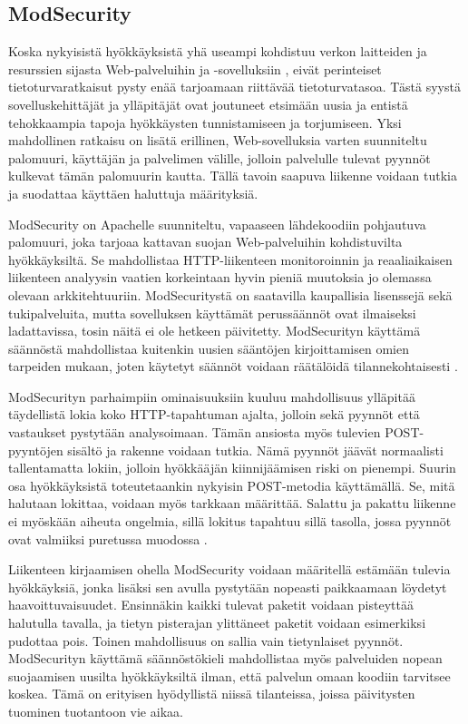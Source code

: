 \subsection{ModSecurity}

Koska nykyisistä hyökkäyksistä yhä useampi kohdistuu verkon laitteiden ja resurssien sijasta Web-palveluihin ja -sovelluksiin \cite{WASCb} \cite{SYM}, eivät perinteiset
tietoturvaratkaisut pysty enää tarjoamaan riittävää tietoturvatasoa. Tästä syystä sovelluskehittäjät ja ylläpitäjät ovat joutuneet etsimään uusia ja entistä tehokkaampia 
tapoja hyökkäysten tunnistamiseen ja torjumiseen. Yksi mahdollinen ratkaisu on lisätä erillinen, Web-sovelluksia varten suunniteltu palomuuri, käyttäjän ja palvelimen 
välille, jolloin palvelulle tulevat pyynnöt kulkevat tämän palomuurin kautta. Tällä tavoin saapuva liikenne voidaan tutkia ja suodattaa käyttäen haluttuja määrityksiä. 

ModSecurity \cite{Mod} on Apachelle suunniteltu, vapaaseen lähdekoodiin pohjautuva palomuuri, joka tarjoaa kattavan suojan Web-palveluihin kohdistuvilta hyökkäyksiltä. 
Se mahdollistaa HTTP-liikenteen monitoroinnin ja reaaliaikaisen liikenteen analyysin vaatien korkeintaan hyvin pieniä muutoksia jo olemassa olevaan arkkitehtuuriin.
ModSecuritystä on saatavilla kaupallisia lisenssejä sekä tukipalveluita, mutta sovelluksen käyttämät perussäännöt ovat ilmaiseksi ladattavissa, tosin näitä
ei ole hetkeen päivitetty. ModSecurityn käyttämä säännöstä mahdollistaa kuitenkin uusien sääntöjen kirjoittamisen omien tarpeiden mukaan, joten käytetyt säännöt voidaan räätälöidä 
tilannekohtaisesti \cite{Mod}. 

ModSecurityn parhaimpiin ominaisuuksiin kuuluu mahdollisuus ylläpitää täydellistä lokia koko HTTP-tapahtuman ajalta, jolloin sekä pyynnöt että vastaukset pystytään analysoimaan.
Tämän ansiosta myös tulevien POST-pyyntöjen sisältö ja rakenne voidaan
tutkia. Nämä pyynnöt jäävät normaalisti tallentamatta lokiin, jolloin
hyökkääjän kiinnijäämisen riski on pienempi. Suurin osa hyökkäyksistä toteutetaankin 
nykyisin POST-metodia käyttämällä. Se, mitä halutaan lokittaa, voidaan myös tarkkaan määrittää. Salattu ja pakattu liikenne ei myöskään aiheuta ongelmia, sillä lokitus tapahtuu sillä tasolla,
jossa pyynnöt ovat valmiiksi puretussa muodossa \cite{Mod}.

Liikenteen kirjaamisen ohella ModSecurity voidaan määritellä estämään tulevia hyökkäyksiä, jonka lisäksi sen avulla pystytään nopeasti paikkaamaan löydetyt haavoittuvaisuudet. 
Ensinnäkin kaikki tulevat paketit voidaan pisteyttää halutulla tavalla, ja tietyn pisterajan ylittäneet paketit voidaan esimerkiksi pudottaa pois. Toinen mahdollisuus on sallia vain 
tietynlaiset pyynnöt. ModSecurityn käyttämä säännöstökieli mahdollistaa myös palveluiden nopean suojaamisen uusilta hyökkäyksiltä ilman, että palvelun omaan koodiin tarvitsee koskea.
Tämä on erityisen hyödyllistä niissä tilanteissa, joissa päivitysten tuominen tuotantoon vie aikaa. 
